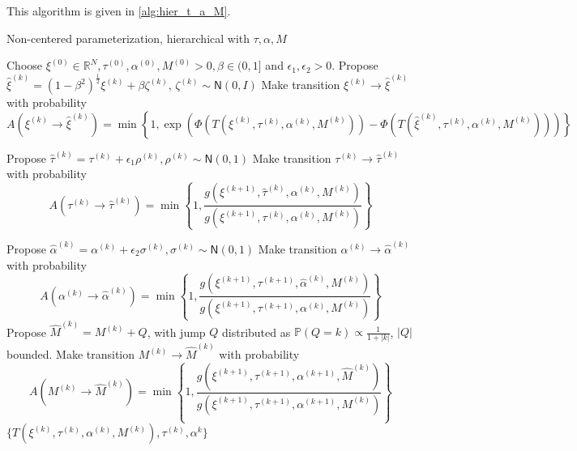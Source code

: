 \documentclass{siamart1116}
\begin{document}
        This algorithm is given in \cref{alg:hier_t_a_M}.

        \begin{algorithm}
            \caption{Non-centered parameterization, hierarchical with $\tau, \alpha, M$}
            \label{alg:hier_t_a_M}
            \begin{algorithmic}[1]
            \State Choose $\xi^{(0)} \in \mathbb{R}^N, \tau^{(0)}, \alpha^{(0)}, M^{(0)} > 0, \beta \in (0, 1]$ and $\epsilon_1, \epsilon_2 > 0$.
            \State Propose $\hat\xi^{(k)} = (1-\beta^2)^{\frac{1}{2}}\xi^{(k)} + \beta \zeta^{(k)}$, $\zeta^{(k)} \sim \mathsf{N}(0, I)$
            \State Make transition $\xi^{(k)} \to \hat\xi^{(k)}$ with probability
            \[ A(\xi^{(k)} \to \hat\xi^{(k)}) = \min\left\{1, \exp\left(\Phi(T(\xi^{(k)},\tau^{(k)},\alpha^{(k)}, M^{(k)})) - \Phi(T(\hat\xi^{(k)},\tau^{(k)},\alpha^{(k)}, M^{(k)}))\right) \right\}\] 

            \State Propose $\hat\tau^{(k)} = \tau^{(k)} + \epsilon_1 \rho^{(k)}, \rho^{(k)} \sim \mathsf{N}(0,1)$
            \State Make transition $\tau^{(k)} \to \hat\tau^{(k)}$ with probability
            \[ A(\tau^{(k)} \to \hat\tau^{(k)}) 
            = \min\left\{1, \frac{g(\xi^{(k+1)},\hat\tau^{(k)},\alpha^{(k)},M^{(k)})}{g(\xi^{(k+1)},\tau^{(k)},\alpha^{(k)},M^{(k)})} \right\}\] 

            \State Propose $\hat\alpha^{(k)} = \alpha^{(k)} + \epsilon_2 \sigma^{(k)}, \sigma^{(k)} \sim \mathsf{N}(0,1)$
            \State Make transition $\alpha^{(k)} \to \hat\alpha^{(k)}$ with probability
            \[ A(\alpha^{(k)} \to \hat\alpha^{(k)}) 
            = \min\left\{1, \frac{g(\xi^{(k+1)},\tau^{(k+1)},\hat \alpha^{(k)},M^{(k)})}{g(\xi^{(k+1)},\tau^{(k+1)},\alpha^{(k)},M^{(k)})} \right\}\]
            \State Propose $\hat M^{(k)} = M^{(k)} + Q$, with jump $Q$ distributed as $\mathbb{P}(Q=k) \propto \frac{1}{1+|k|}$, $|Q|$ bounded.
            \State Make transition $M^{(k)} \to \hat M^{(k)}$ with probability
            \[ A(M^{(k)} \to \hat M^{(k)}) = 
            \min\left\{1, \frac{g(\xi^{(k+1)},\tau^{(k+1)},\alpha^{(k+1)},\hat M^{(k)})}{g(\xi^{(k+1)},\tau^{(k+1)},\alpha^{(k+1)},M^{(k)})} \right\}
            \]
            \EndFor
            \State \Return $\{ T(\xi^{(k)},\tau^{(k)},\alpha^{(k)}, M^{(k)}), \tau^{(k)}, \alpha^{k} \}$
            \end{algorithmic}
        \end{algorithm}
\end{document}
